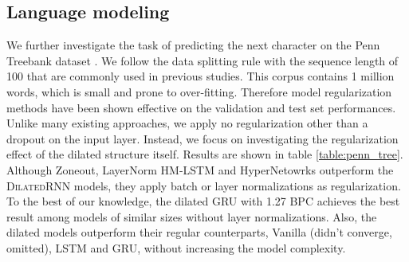 \documentclass{article}
\newcommand{\algname}{\textsc{DilatedRNN }}
\begin{document}
\subsection{Language modeling}
We further investigate the task of predicting the next character on the Penn Treebank dataset \cite{marcus1993building}.  We follow the data splitting rule with the sequence length of 100 that are commonly used in previous studies. This corpus contains 1 million words, which is small and prone to over-fitting. Therefore model regularization methods have been shown effective on the validation and test set performances. Unlike many existing approaches, we apply no regularization other than a dropout on the input layer. Instead, we focus on investigating the regularization effect of the dilated structure itself.   Results are shown in table \ref{table:penn_tree}.   Although Zoneout, LayerNorm HM-LSTM and HyperNetowrks outperform the \algname models, they apply batch or layer normalizations as regularization. To the best of our knowledge, the dilated GRU with 1.27 BPC achieves the best result among models of similar sizes without layer normalizations. Also, the dilated models outperform their regular counterparts, Vanilla (didn't converge, omitted), LSTM and GRU, without increasing the model complexity.
\end{document}
